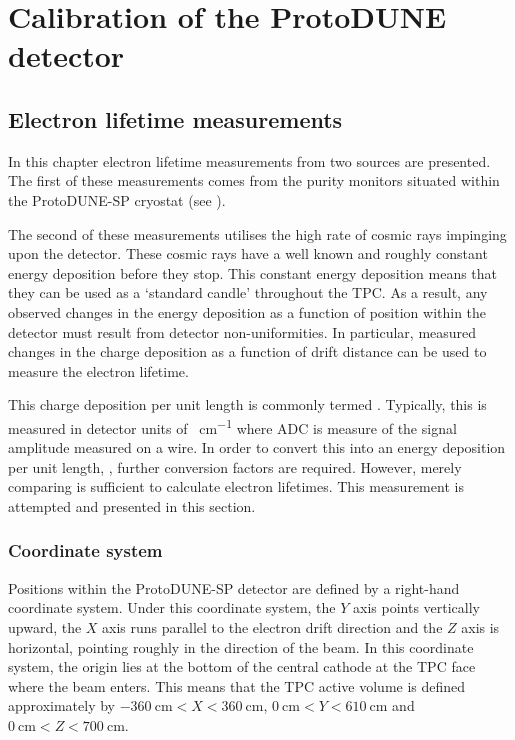 \chapter{Calibration of the ProtoDUNE detector}
\label{sec:pdune_calibration}

\section{Electron lifetime measurements}
\label{sec:pdune_calibration:lifetime}

In this chapter electron lifetime measurements from two sources are presented.
The first of these measurements comes from the purity monitors situated within the ProtoDUNE-SP cryostat (see ).

The second of these measurements utilises the high rate of cosmic rays impinging upon the detector.
These cosmic rays have a well known and roughly constant energy deposition before they stop.
This constant energy deposition means that they can be used as a `standard candle' throughout the TPC.
As a result, any observed changes in the energy deposition as a function of position within the detector must result from detector non-uniformities.
In particular, measured changes in the charge deposition as a function of drift distance can be used to measure the electron lifetime.

This charge deposition per unit length is commonly termed \dqdx.
Typically, this \dqdx is measured in detector units of \si{\ADC\per\cm} where ADC is measure of the signal amplitude measured on a wire.
In order to convert this into an energy deposition per unit length, \dedx, further conversion factors are required.
However, merely comparing \dqdx is sufficient to calculate electron lifetimes.
This measurement is attempted and presented in this section.

\subsection{Coordinate system}
\label{sec:pdune_calibration:lifetime:coords}

Positions within the ProtoDUNE-SP detector are defined by a right-hand coordinate system.
Under this coordinate system, the $Y$ axis points vertically upward, the $X$ axis runs parallel to the electron drift direction and the $Z$ axis is horizontal, pointing roughly in the direction of the beam.
In this coordinate system, the origin lies at the bottom of the central cathode at the TPC face where the beam enters.
This means that the TPC active volume is defined approximately by $\SI{-360}{\cm} < X < \SI{360}{\cm}$, $\SI{0}{\cm} < Y < \SI{610}{\cm}$ and $\SI{0}{\cm} < Z < \SI{700}{\cm}$.

